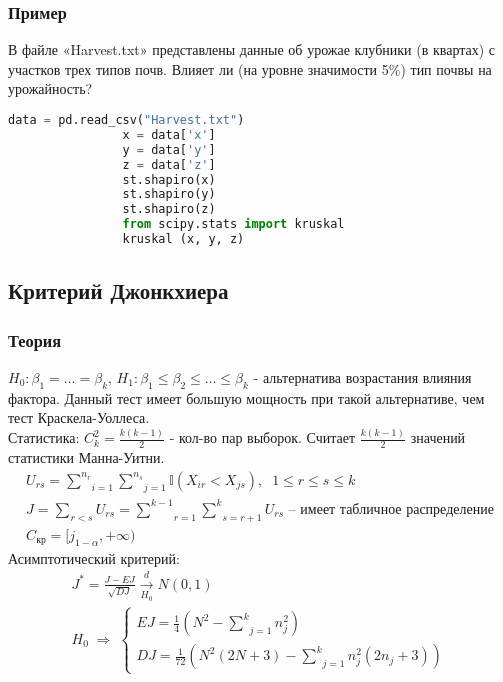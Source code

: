 		\subsubsection*{Пример}\label{cha:uniform/sec:k/subsec:kraskel/subsubsec:prob}

		\begin{problem}
			В файле «Harvest.txt» представлены данные об урожае клубники (в квартах) с участков трех типов почв. Влияет ли (на уровне значимости 5$\%$) тип почвы на урожайность?
		\end{problem}
		\begin{solution}
			\begin{lstlisting}[language=Python]
				data = pd.read_csv("Harvest.txt")
				x = data['x']
				y = data['y']
				z = data['z']
				st.shapiro(x)
				st.shapiro(y)
				st.shapiro(z)
				from scipy.stats import kruskal
				kruskal (x, y, z)
			\end{lstlisting}
		\end{solution}

	\subsection{Критерий Джонкхиера}\label{cha:uniform/sec:k/john}

		\subsubsection*{Теория}\label{cha:uniform/sec:k/subsec:john/subsubsec:theory}

		$H_0: \beta_1 = \dots = \beta_k$, $H_1: \beta_1 \le \beta_2 \le \dots \le \beta_k$ - альтернатива возрастания влияния фактора. Данный тест имеет большую мощность при такой альтернативе, чем тест Краскела-Уоллеса.\\

		Статистика: $C_k^2 = \frac{k(k-1)}{2}$ - кол-во пар выборок. Считает $\frac{k(k-1)}{2}$ значений статистики Манна-Уитни.
		$$\begin{gathered}
			U_{rs} = \underset{i=1}{\overset{n_r}{\sum}}\underset{j=1}{\overset{n_s}{\sum}}\mathbb{I}(X_{i r} < X_{j s}), \;\; 1 \le r \le s \le k \\
			J = \underset{r < s}{\overset{}{\sum}}U_{rs} = \underset{r=1}{\overset{k-1}{\sum}}\underset{s=r+1}{\overset{k}{\sum}}U_{rs} \text{ -- имеет табличное распределение}\\
			C_{\text{кр}} = [j_{1-\alpha}, +\infty)
		\end{gathered}$$
		Асимптотический критерий:
		$$\begin{gathered}
			J^{*} = \frac{J - E J}{\sqrt{D J}} \xrightarrow[H_0]{d}N(0,1) \\
			H_0 \; \Rightarrow \; \begin{cases}
				E J = \frac{1}{4}\left( N^2 - \underset{j=1}{\overset{k}{\sum}}n_j^2 \right) \\
				D J = \frac{1}{72} \left( N^2 (2N +3) - \underset{j=1}{\overset{k}{\sum}}n_j^2 (2n_j + 3) \right)
			\end{cases}
		\end{gathered}$$


